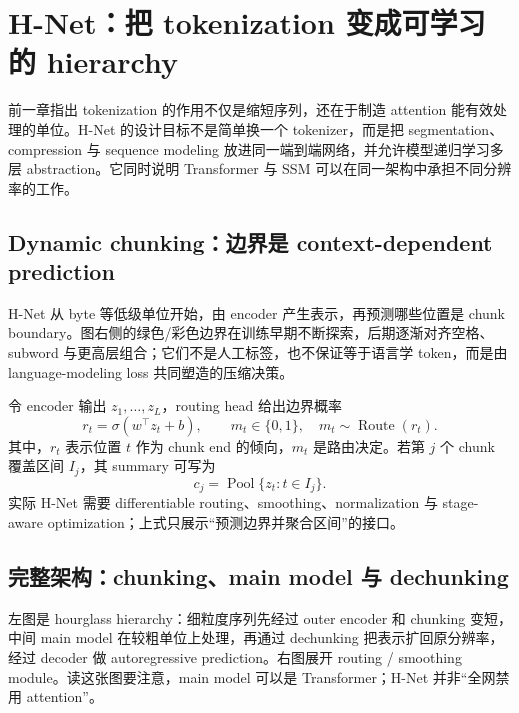 \section{H-Net：把 tokenization 变成可学习的 hierarchy}

前一章指出 tokenization 的作用不仅是缩短序列，还在于制造 attention 能有效处理的单位。H-Net 的设计目标不是简单换一个 tokenizer，而是把 segmentation、compression 与 sequence modeling 放进同一端到端网络，并允许模型递归学习多层 abstraction。它同时说明 Transformer 与 SSM 可以在同一架构中承担不同分辨率的工作。

\subsection{Dynamic chunking：边界是 context-dependent prediction}

H-Net 从 byte 等低级单位开始，由 encoder 产生表示，再预测哪些位置是 chunk boundary。图右侧的绿色/彩色边界在训练早期不断探索，后期逐渐对齐空格、subword 与更高层组合；它们不是人工标签，也不保证等于语言学 token，而是由 language-modeling loss 共同塑造的压缩决策。


令 encoder 输出 $z_1,\ldots,z_L$，routing head 给出边界概率
\[
r_t=\sigma(w^\top z_t+b),
\qquad
m_t\in\{0,1\},\quad m_t\sim\operatorname{Route}(r_t).
\]
其中，$r_t$ 表示位置 $t$ 作为 chunk end 的倾向，$m_t$ 是路由决定。若第 $j$ 个 chunk 覆盖区间 $I_j$，其 summary 可写为
\[
c_j=\operatorname{Pool}\{z_t:t\in I_j\}.
\]
实际 H-Net 需要 differentiable routing、smoothing、normalization 与 stage-aware optimization；上式只展示“预测边界并聚合区间”的接口。


\subsection{完整架构：chunking、main model 与 dechunking}

左图是 hourglass hierarchy：细粒度序列先经过 outer encoder 和 chunking 变短，中间 main model 在较粗单位上处理，再通过 dechunking 把表示扩回原分辨率，经过 decoder 做 autoregressive prediction。右图展开 routing / smoothing module。读这张图要注意，main model 可以是 Transformer；H-Net 并非“全网禁用 attention”。

